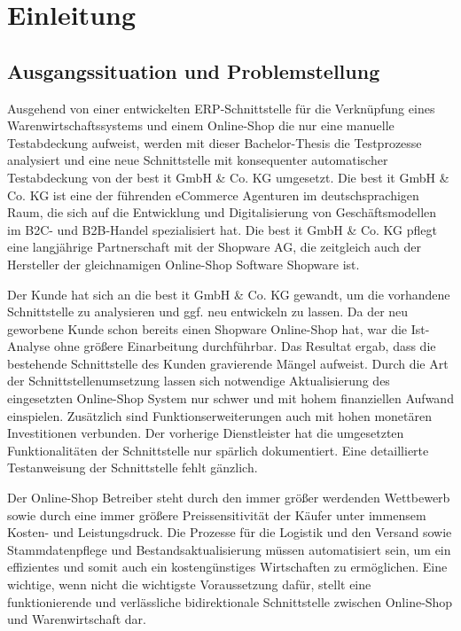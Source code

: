 \section{Einleitung}
\subsection{Ausgangssituation und Problemstellung}
Ausgehend von einer entwickelten ERP-Schnittstelle für die Verknüpfung eines Warenwirtschaftssystems und einem Online-Shop die nur eine manuelle Testabdeckung aufweist, werden mit dieser Bachelor-Thesis die Testprozesse analysiert und eine neue Schnittstelle mit konsequenter automatischer Testabdeckung von der best it GmbH \& Co. KG umgesetzt. Die best it GmbH \& Co. KG ist eine der führenden eCommerce Agenturen im deutschsprachigen Raum, die sich auf die Entwicklung und Digitalisierung von Geschäftsmodellen im B2C- und B2B-Handel spezialisiert hat. Die best it GmbH \& Co. KG pflegt eine langjährige Partnerschaft mit der Shopware AG, die zeitgleich auch der Hersteller der gleichnamigen Online-Shop Software Shopware ist. 

Der Kunde hat sich an die best it GmbH \& Co. KG gewandt, um die vorhandene Schnittstelle zu analysieren und ggf. neu entwickeln zu lassen. Da der neu geworbene Kunde schon bereits einen Shopware Online-Shop hat, war die Ist-Analyse ohne größere Einarbeitung durchführbar. Das Resultat ergab, dass die bestehende Schnittstelle des Kunden gravierende Mängel aufweist. Durch die Art der Schnittstellenumsetzung lassen sich notwendige Aktualisierung des eingesetzten Online-Shop System nur schwer und mit hohem finanziellen Aufwand einspielen. Zusätzlich sind Funktionserweiterungen auch mit hohen monetären Investitionen verbunden. Der vorherige Dienstleister hat die umgesetzten Funktionalitäten der Schnittstelle nur spärlich dokumentiert. Eine detaillierte Testanweisung der Schnittstelle fehlt gänzlich. 

Der Online-Shop Betreiber steht durch den immer größer werdenden Wettbewerb sowie durch eine immer größere Preissensitivität der Käufer unter immensem Kosten- und Leistungsdruck. Die Prozesse für die Logistik und den Versand sowie Stammdatenpflege und Bestandsaktualisierung müssen automatisiert sein, um ein effizientes und somit auch ein kostengünstiges Wirtschaften zu ermöglichen. Eine wichtige, wenn nicht die wichtigste Voraussetzung dafür, stellt eine funktionierende und verlässliche bidirektionale Schnittstelle zwischen Online-Shop und Warenwirtschaft dar.

